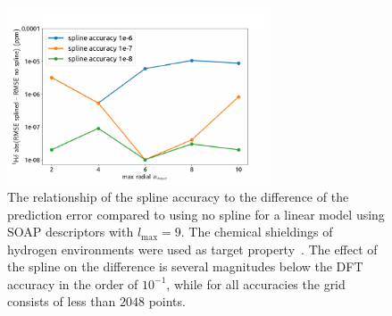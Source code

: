 \begin{figure}
    \centering
    \includegraphics[width=0.7\textwidth]{fig/spline-accuracy-v2.pdf}
    \caption{The relationship of the spline accuracy to the difference of the prediction error compared to using no spline for a linear model using SOAP descriptors with $l_\textrm{max}=9$.
      The chemical shieldings of hydrogen environments were used as target property~\cite{paruzzo2018chemical}.
    The effect of the spline on the difference is several magnitudes below the DFT accuracy in the order of $10^{-1}$, while for all accuracies the grid consists of less than $2048$ points.}
    \label{fig:chemical_shift-spline}
\end{figure}

